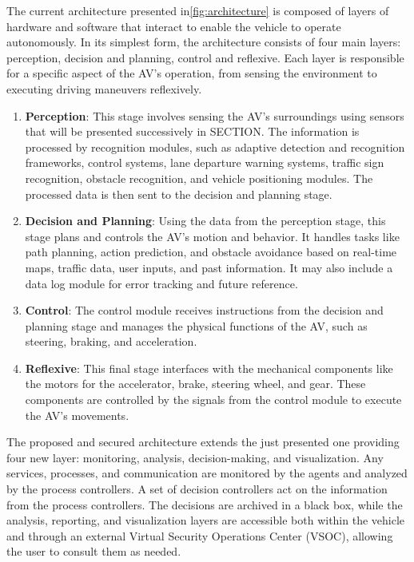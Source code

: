 The current architecture presented in\ref{fig:architecture} is composed of layers of hardware and software that interact to enable the vehicle to operate autonomously.
In its simplest form, the architecture consists of four main layers: perception, decision and planning, control and reflexive.
Each layer is responsible for a specific aspect of the AV's operation, from sensing the environment to executing driving maneuvers reflexively\cite{architecture}.

\begin{enumerate}
    \item \textbf{Perception}: This stage involves sensing the AV's surroundings using sensors that will be presented successively in SECTION. The information is processed by recognition modules, such as adaptive detection and recognition frameworks, control systems, lane departure warning systems, traffic sign recognition, obstacle recognition, and vehicle positioning modules.
    The processed data is then sent to the decision and planning stage.
    \item \textbf{Decision and Planning}: Using the data from the perception stage, this stage plans and controls the AV's motion and behavior.
    It handles tasks like path planning, action prediction, and obstacle avoidance based on real-time maps, traffic data, user inputs, and past information.
    It may also include a data log module for error tracking and future reference.
    \item \textbf{Control}: The control module receives instructions from the decision and planning stage and manages the physical functions of the AV, such as steering, braking, and acceleration.
    \item \textbf{Reflexive}: This final stage interfaces with the mechanical components like the motors for the accelerator, brake, steering wheel, and gear.
    These components are controlled by the signals from the control module to execute the AV’s movements.
\end{enumerate}

The proposed and secured architecture extends the just presented one providing four new layer: monitoring, analysis, decision-making, and visualization.
Any services, processes, and communication are monitored by the agents and analyzed by the process controllers.
A set of decision controllers act on the information from the process controllers.
The decisions are archived in a black box, while the analysis, reporting, and visualization layers are accessible both within the vehicle and through an external Virtual Security Operations Center (VSOC), allowing the user to consult them as needed\cite{adu-kyere2023self-aware}.

